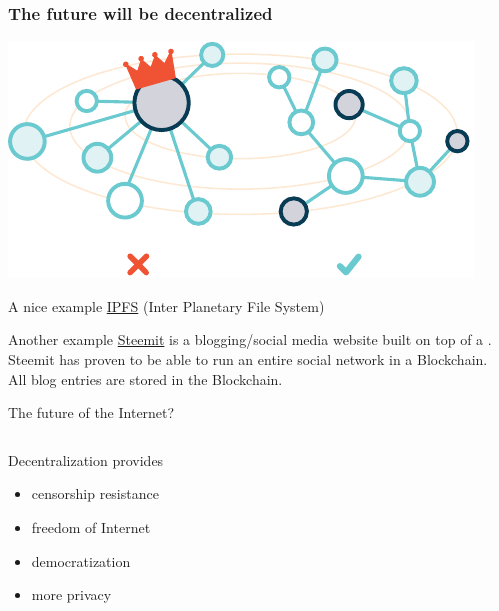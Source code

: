 \documentclass[notitlepage, usenames,dvipsnames]{beamer}
\newcommand{\st}{\structure}
\begin{document}
    \begin{frame}
        \frametitle{The future will be decentralized}

         {
            \centering\includegraphics[scale=0.5]{../img/ipfs.pdf}

            \begin{exampleblock}{A nice example}
                \href{https://ipfs.io/}{IPFS} (Inter Planetary File System)
            \end{exampleblock}

            \begin{exampleblock}{Another example}
                \href{https://steemit.com/}{Steemit} is a blogging/social media website built on top of a \st{Blockchain}.\\[1ex]

                Steemit has proven to be able to run an entire social network in a Blockchain.\\[1ex]

                All blog entries are stored in the Blockchain.
            \end{exampleblock}
        }

         {
            \vspace{-2em}
            \begin{center}{\huge The future of the Internet?}\end{center}

            \vspace{2em}
            \begin{columns}
                \centering
                \begin{minipage}{5cm}
                \begin{block}{Decentralization provides}
                    \begin{itemize}
                        \item censorship resistance
                        \item freedom of Internet
                        \item democratization
                        \item more privacy
                    \end{itemize}
                \end{block}
                \end{minipage}


\end{columns}}
\end{frame}
\end{document}

